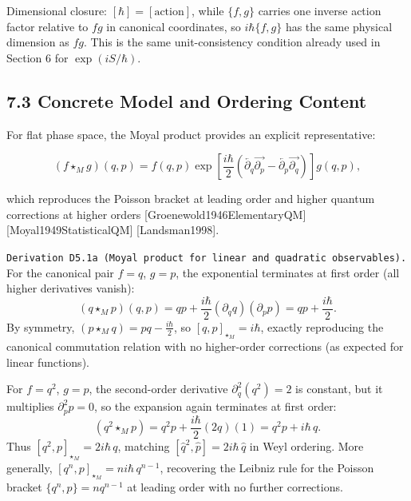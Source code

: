 \documentclass[
]{article}
\begin{document}
Dimensional closure: \([\hbar]=[\text{action}]\), while \(\{f,g\}\)
carries one inverse action factor relative to \(fg\) in canonical
coordinates, so \(i\hbar\{f,g\}\) has the same physical dimension as
\(fg\). This is the same unit-consistency condition already used in
Section 6 for \(\exp(iS/\hbar)\).

\subsection{7.3 Concrete Model and Ordering
Content}\label{concrete-model-and-ordering-content}

For flat phase space, the Moyal product provides an explicit
representative:

\[
(f\star_M g)(q,p)
=
f(q,p)\exp\!\left[
\frac{i\hbar}{2}
\left(
\overleftarrow{\partial_q}\overrightarrow{\partial_p}
-\overleftarrow{\partial_p}\overrightarrow{\partial_q}
\right)\right]g(q,p),
\]

which reproduces the Poisson bracket at leading order and higher quantum
corrections at higher orders {[}Groenewold1946ElementaryQM{]}
{[}Moyal1949StatisticalQM{]} {[}Landsman1998{]}.

\texttt{Derivation\ D5.1a\ (Moyal\ product\ for\ linear\ and\ quadratic\ observables).}
For the canonical pair \(f=q\), \(g=p\), the exponential terminates at
first order (all higher derivatives vanish): \[
(q\star_M p)(q,p)
=qp+\frac{i\hbar}{2}(\partial_q q)(\partial_p p)
=qp+\frac{i\hbar}{2}.
\] By symmetry, \((p\star_M q)=pq-\frac{i\hbar}{2}\), so
\([q,p]_{\star_M}=i\hbar\), exactly reproducing the canonical
commutation relation with no higher-order corrections (as expected for
linear functions).

For \(f=q^2\), \(g=p\), the second-order derivative
\(\partial_q^2(q^2)=2\) is constant, but it multiplies
\(\partial_p^2 p=0\), so the expansion again terminates at first order:
\[
(q^2\star_M p)=q^2p+\frac{i\hbar}{2}(2q)(1)=q^2p+i\hbar\,q.
\] Thus \([q^2,p]_{\star_M}=2i\hbar\,q\), matching
\([\hat q^2,\hat p]=2i\hbar\,\hat q\) in Weyl ordering. More generally,
\([q^n,p]_{\star_M}=ni\hbar\,q^{n-1}\), recovering the Leibniz rule for
the Poisson bracket \(\{q^n,p\}=nq^{n-1}\) at leading order with no
further corrections.
\end{document}
